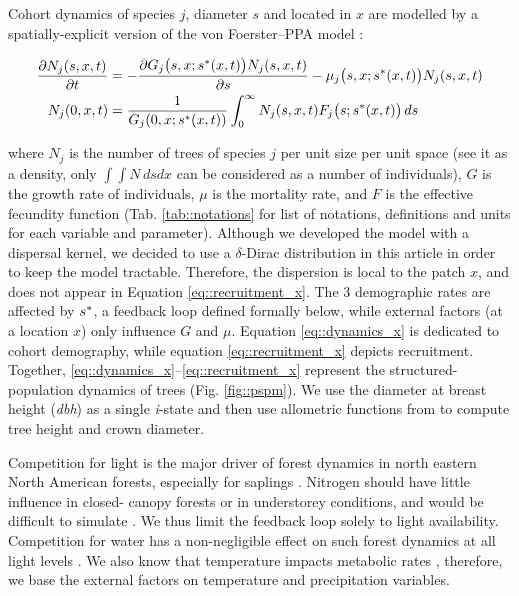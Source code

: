 Cohort dynamics of species $ j $, diameter $ s $ and located in $ x $ are
modelled by a spatially-explicit version of the von Foerster--PPA model
\citep{Strigul2008}:

\begin{align}
	\frac{\partial N_j(s, x, t)}{\partial t} &= - \frac{\partial G_j \big(s, x; {s}^{*}(x, t) \big) N_j(s, x, t)}{\partial s} - \mu_j\big(s, x; {s}^{*}(x, t) \big) N_j(s, x, t) \label{eq::dynamics_x} \\
	N_j(0, x, t) &= \frac{1}{G_j(0, x; {s}^{*}(x, t))} \int_0^{\infty} N_j(s, x, t) F_j\big(s; {s}^{*}(x, t) \big) \, ds \label{eq::recruitment_x}
\end{align}

\noindent where $ N_j $ is the number of trees of species $ j $ per unit size
per unit space (see it as a density, only $ \int \int N \, ds dx $ can be
considered as a number of individuals), $ G $ is the growth rate of
individuals, $ \mu $ is the mortality rate, and $ F $ is the effective
fecundity function (\cf Tab. \ref{tab::notations} for list of notations,
definitions and units for each variable and parameter). Although we developed
the model with a dispersal kernel, we decided to use a $ \delta $-Dirac
distribution in this article in order to keep the model tractable. Therefore,
the dispersion is local to the patch $ x $, and does not appear in Equation
\eqref{eq::recruitment_x}. The 3 demographic rates are affected by $ {s}^{*} $, a
feedback loop defined formally below, while external
factors (at a location $ x $) only influence $ G $ and $ \mu $. Equation
\eqref{eq::dynamics_x} is dedicated to cohort demography, while equation
\eqref{eq::recruitment_x} depicts recruitment. Together,
\eqref{eq::dynamics_x}--\eqref{eq::recruitment_x} represent the structured-
population dynamics of trees (Fig. \ref{fig::pspm}). We use the diameter at
breast height (\textit{dbh}) as a single \textit{i}-state and then use
allometric functions from \citet{Purves2007} to compute tree height and crown
diameter.

Competition for light is the major driver of forest dynamics in north eastern
North American forests, especially for saplings \citep{Pacala1996, Purves2007}. Nitrogen should have little influence in closed-
canopy forests or in understorey conditions, and would be difficult to
simulate \citep{Kobe2006}. We thus limit the feedback loop solely to light
availability. Competition for water has a non-negligible effect on such forest
dynamics at all light levels \citep{Kobe2006}. We also know that temperature
impacts metabolic rates \citep{Brown2004}, therefore, we base the external factors on
temperature and precipitation variables.


